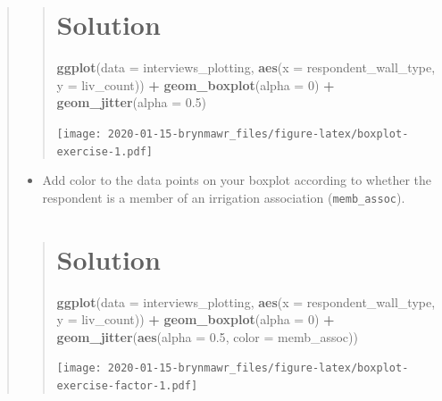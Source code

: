 \documentclass[]{book}
\newenvironment{Shaded}{\begin{snugshade}}{\end{snugshade}}
\newcommand{\KeywordTok}[1]{\textcolor[rgb]{0.13,0.29,0.53}{\textbf{#1}}}
\newcommand{\DataTypeTok}[1]{\textcolor[rgb]{0.13,0.29,0.53}{#1}}
\newcommand{\DecValTok}[1]{\textcolor[rgb]{0.00,0.00,0.81}{#1}}
\newcommand{\FloatTok}[1]{\textcolor[rgb]{0.00,0.00,0.81}{#1}}
\newcommand{\StringTok}[1]{\textcolor[rgb]{0.31,0.60,0.02}{#1}}
\newcommand{\OperatorTok}[1]{\textcolor[rgb]{0.81,0.36,0.00}{\textbf{#1}}}
\newcommand{\NormalTok}[1]{#1}
\providecommand{\tightlist}{%
  \setlength{\itemsep}{0pt}\setlength{\parskip}{0pt}}
\begin{document}
\begin{quote}
\begin{quote}
\section{Solution}\label{solution-15}

\begin{Shaded}
\begin{Highlighting}[]
\KeywordTok{ggplot}\NormalTok{(}\DataTypeTok{data =}\NormalTok{ interviews_plotting, }\KeywordTok{aes}\NormalTok{(}\DataTypeTok{x =}\NormalTok{ respondent_wall_type, }\DataTypeTok{y =}\NormalTok{ liv_count)) }\OperatorTok{+}
\StringTok{  }\KeywordTok{geom_boxplot}\NormalTok{(}\DataTypeTok{alpha =} \DecValTok{0}\NormalTok{) }\OperatorTok{+}
\StringTok{  }\KeywordTok{geom_jitter}\NormalTok{(}\DataTypeTok{alpha =} \FloatTok{0.5}\NormalTok{)}
\end{Highlighting}
\end{Shaded}

\texttt{[image: 2020-01-15-brynmawr\_files/figure-latex/boxplot-exercise-1.pdf]}
\end{quote}

\begin{itemize}
\tightlist
\item
  Add color to the data points on your boxplot according to whether the
  respondent is a member of an irrigation association
  (\texttt{memb\_assoc}).
\end{itemize}

\begin{quote}
\section{Solution}\label{solution-16}

\begin{Shaded}
\begin{Highlighting}[]
\KeywordTok{ggplot}\NormalTok{(}\DataTypeTok{data =}\NormalTok{ interviews_plotting, }\KeywordTok{aes}\NormalTok{(}\DataTypeTok{x =}\NormalTok{ respondent_wall_type, }\DataTypeTok{y =}\NormalTok{ liv_count)) }\OperatorTok{+}
\StringTok{  }\KeywordTok{geom_boxplot}\NormalTok{(}\DataTypeTok{alpha =} \DecValTok{0}\NormalTok{) }\OperatorTok{+}
\StringTok{  }\KeywordTok{geom_jitter}\NormalTok{(}\KeywordTok{aes}\NormalTok{(}\DataTypeTok{alpha =} \FloatTok{0.5}\NormalTok{, }\DataTypeTok{color =}\NormalTok{ memb_assoc))}
\end{Highlighting}
\end{Shaded}

\texttt{[image: 2020-01-15-brynmawr\_files/figure-latex/boxplot-exercise-factor-1.pdf]}
\end{quote}
\end{quote}
\end{document}
